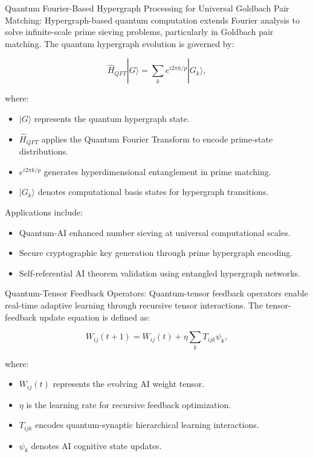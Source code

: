 \pa Quantum Fourier-Based Hypergraph Processing for Universal Goldbach Pair Matching: Hypergraph-based quantum computation extends Fourier analysis to solve infinite-scale prime sieving problems, particularly in Goldbach pair matching. The quantum hypergraph evolution is governed by:

\begin{equation}
\hat{H}_{QFT} |G\rangle = \sum_{k} e^{i 2\pi k / p} |G_k\rangle,
\end{equation}

where:
\begin{itemize}
    \item $|G\rangle$ represents the quantum hypergraph state.
    \item $\hat{H}_{QFT}$ applies the Quantum Fourier Transform to encode prime-state distributions.
    \item $e^{i 2\pi k / p}$ generates hyperdimensional entanglement in prime matching.
    \item $|G_k\rangle$ denotes computational basis states for hypergraph transitions.
\end{itemize}

Applications include:
\begin{itemize}
    \item Quantum-AI enhanced number sieving at universal computational scales.
    \item Secure cryptographic key generation through prime hypergraph encoding.
    \item Self-referential AI theorem validation using entangled hypergraph networks.
\end{itemize}

\pa Quantum-Tensor Feedback Operators: Quantum-tensor feedback operators enable real-time adaptive learning through recursive tensor interactions. The tensor-feedback update equation is defined as:

\begin{equation}
W_{ij}(t+1) = W_{ij}(t) + \eta \sum_{k} T_{ijk} \psi_k,
\end{equation}

where:
\begin{itemize}
    \item $W_{ij}(t)$ represents the evolving AI weight tensor.
    \item $\eta$ is the learning rate for recursive feedback optimization.
    \item $T_{ijk}$ encodes quantum-synaptic hierarchical learning interactions.
    \item $\psi_k$ denotes AI cognitive state updates.
\end{itemize}

